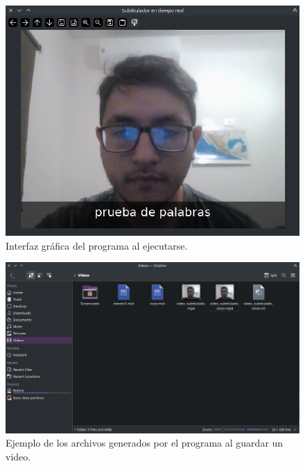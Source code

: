 \documentclass[conference]{IEEEtran}
\begin{document}
\begin{figure}[ht]
    \centering
    \includegraphics[width=\columnwidth]{images/default-UI.png}
    \caption{Interfaz gráfica del programa al ejecutarse.}
    \label{fig:default-UI}
\end{figure}

\begin{figure}[ht]
    \centering
    \includegraphics[width=\columnwidth]{images/generated-images.png}
    \caption{Ejemplo de los archivos generados por el programa al guardar un video.}
    \label{fig:generated-images}
\end{figure}
\end{document}

